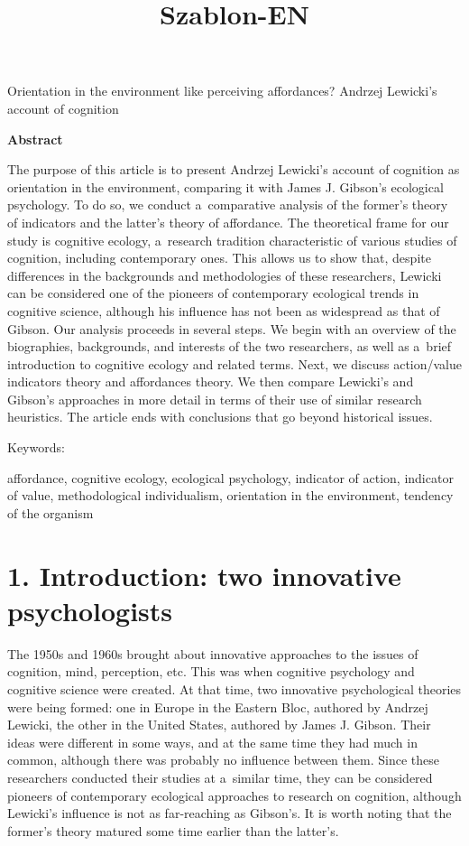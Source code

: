\setcounter{secnumdepth}{2}



\title{Szablon-EN}



Orientation in the environment like perceiving affordances? Andrzej Lewicki's account of cognition





\textbf{Abstract}



The purpose of this article is to present Andrzej Lewicki's account of cognition as orientation in the environment, comparing it with James J. Gibson's ecological psychology. To do so, we conduct a~comparative analysis of the former's theory of indicators and the latter's theory of affordance. The theoretical frame for our study is cognitive ecology, a~research tradition characteristic of various studies of cognition, including contemporary ones. This allows us to show that, despite differences in the backgrounds and methodologies of these researchers, Lewicki can be considered one of the pioneers of contemporary ecological trends in cognitive science, although his influence has not been as widespread as that of Gibson. Our analysis proceeds in several steps. We begin with an overview of the biographies, backgrounds, and interests of the two researchers, as well as a~brief introduction to cognitive ecology and related terms. Next, we discuss action/value indicators theory and affordances theory. We then compare Lewicki's and Gibson's approaches in more detail in terms of their use of similar research heuristics. The article ends with conclusions that go beyond historical issues.



Keywords:



affordance, cognitive ecology, ecological psychology, indicator of action, indicator of value, methodological individualism, orientation in the environment, tendency of the organism



\section*{1. Introduction: two innovative psychologists}

The 1950s and 1960s brought about innovative approaches to the issues of cognition, mind, perception, etc. This was when cognitive psychology and cognitive science were created. At that time, two innovative psychological theories were being formed: one in Europe in the Eastern Bloc, authored by Andrzej Lewicki, the other in the United States, authored by James J. Gibson. Their ideas were different in some ways, and at the same time they had much in common, although there was probably no influence between them. Since these researchers conducted their studies at a~similar time, they can be considered pioneers of contemporary ecological approaches to research on cognition, although Lewicki's influence is not as far-reaching as Gibson's. It is worth noting that the former's theory matured some time earlier than the latter's.



